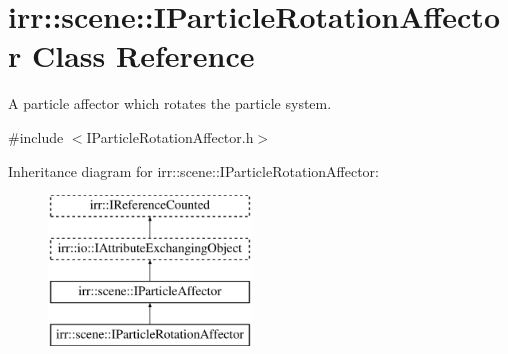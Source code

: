 \hypertarget{classirr_1_1scene_1_1IParticleRotationAffector}{}\section{irr\+:\+:scene\+:\+:I\+Particle\+Rotation\+Affector Class Reference}
\label{classirr_1_1scene_1_1IParticleRotationAffector}


A particle affector which rotates the particle system.  




{\ttfamily \#include $<$I\+Particle\+Rotation\+Affector.\+h$>$}

Inheritance diagram for irr\+:\+:scene\+:\+:I\+Particle\+Rotation\+Affector\+:\begin{figure}[H]
\begin{center}
\leavevmode
\includegraphics[height=4.000000cm]{classirr_1_1scene_1_1IParticleRotationAffector}
\end{center}
\end{figure}
